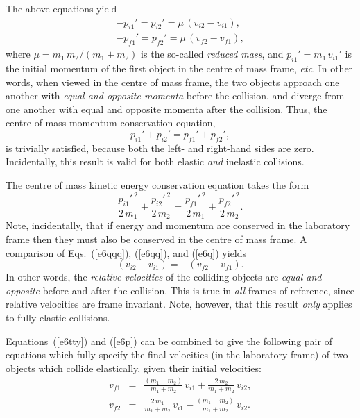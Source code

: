The above equations yield
\begin{eqnarray}
-p_{i1}' = p_{i2}' = \mu\,(v_{i2}-v_{i1}),\label{e6qqq}\\[0.5ex]
-p_{f1}' = p_{f2}' = \mu\,(v_{f2}-v_{f1}),\label{e6qq}
\end{eqnarray}
where $\mu = m_1\,m_2/(m_1+m_2)$ is the
so-called {\em reduced mass}, and $p_{i1}' = m_1\,v_{i1}'$ is the initial momentum of the first object in the
centre of mass frame, {\em etc}. In other words, when viewed in the centre of mass frame, the 
two objects approach one another with {\em equal and opposite momenta} before the collision,
and diverge from one another with equal and opposite momenta after the collision.
Thus, the centre of mass momentum conservation equation,
\begin{equation}
p_{i1}' + p_{i2}' = p_{f1}' + p_{f2}',
\end{equation}
is trivially satisfied, because both the left- and right-hand sides are zero. Incidentally,
this result is valid for both elastic {\em and} inelastic collisions.

The centre of mass kinetic energy conservation equation takes the form
\begin{equation}
\frac{p_{i1}'^{~2}}{2\,m_1} +  \frac{p_{i2}'^{~2}}{2\,m_2} = 
\frac{p_{f1}'^{~2}}{2\,m_1} +  \frac{p_{f2}'^{~2}}{2\,m_2}.\label{e6q}
\end{equation}
Note, incidentally, that if energy and momentum are conserved in the laboratory frame then
they must also be conserved in the centre of mass frame. A comparison
of Eqs.~(\ref{e6qqq}), (\ref{e6qq}), and (\ref{e6q}) yields
\begin{equation}
(v_{i2}-v_{i1}) = - (v_{f2}-v_{f1}).\label{e6p}
\end{equation}
In other words, the {\em relative velocities} of the colliding objects are {\em equal and
opposite} before and after the collision. This is true in {\em all} frames of
reference, since relative velocities are frame invariant. Note, however, that this
result {\em only} applies to fully elastic collisions. 

Equations~(\ref{e6tty}) and (\ref{e6p}) can be combined to give the following
pair of equations which fully specify the final velocities (in the laboratory frame) of two objects
which collide elastically, given their initial velocities:
\begin{eqnarray}
v_{f1} &=&  \frac{(m_1-m_2)}{m_1+m_2}\,v_{i1} + \frac{2\,m_2}{m_1+m_2}\,v_{i2},\label{e6hh}\\[0.5ex]
v_{f2} &=& \frac{2\,m_1}{m_1+m_2}\,v_{i1} -  \frac{(m_1-m_2)}{m_1+m_2}\,v_{i2}.\label{e6hhh}
\end{eqnarray}

